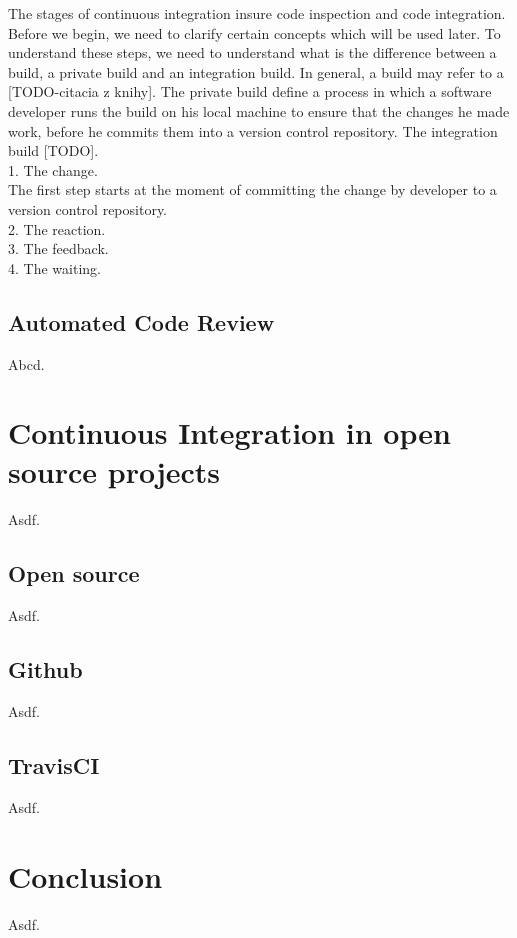 The stages of continuous integration insure code inspection and code integration. Before we begin, we need to clarify certain concepts which will be used later. To understand these steps, we need to understand what is the difference between a build, a private build and an integration build. In general, a build may refer to a [TODO-citacia z knihy]. The private build define a process in which a software developer runs the build on his local machine to ensure that the changes he made work, before he commits them into a version control repository. The integration build [TODO].\\

1. The change.\\

The first step starts at the moment of committing the change by developer to a version control repository.\\

2. The reaction.\\

3. The feedback.\\

4. The waiting.\\

\section{Automated Code Review}
Abcd.

\chapter{Continuous Integration in open source projects}
Asdf.

\section{Open source}
Asdf.

\section{Github}
Asdf.

\section{TravisCI}
Asdf.

\chapter{Conclusion}
Asdf.

